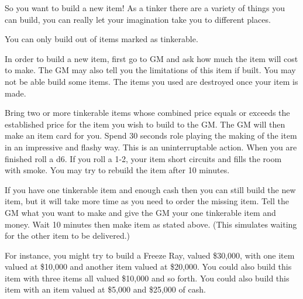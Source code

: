\documentclass[green]{LRSguildcamp1}
\begin{document}
\name{\gTinkering{}}

So you want to build a new item! As a tinker there are a variety of things you can build, you can really let your imagination take you to different places. 

You can only build out of items marked as tinkerable.

In order to build a new item, first go to GM and ask how much the item will cost to make. The GM may also tell you the limitations of this item if built. You may not be able build some items. The items you used are destroyed once your item is made.

Bring two or more tinkerable items whose combined price equals or exceeds the established price for the item you wish to build to the GM. 
The GM will then make an item card for you. Spend 30 seconds role playing the making of the item in an impressive and flashy way. This is an uninterruptable action. When you are finished roll a d6.  If you roll a 1-2, your item short circuits and fills the room with smoke. You may try to rebuild the item after 10 minutes. 

If you have one tinkerable item and enough cash then you can still build the new item, but it will take more time as you need to order the missing item. Tell the GM what you want to make and give the GM your one tinkerable item and money. Wait 10 minutes then make item as stated above. (This simulates waiting for the other item to be delivered.) 

For instance, you might try to build a Freeze Ray, valued \$30,000, with one item valued at \$10,000 and another item valued at \$20,000. You could also build this item with three items all valued \$10,000 and so forth. You could also build this item with an item valued at \$5,000 and \$25,000 of cash. 

\end{document}
